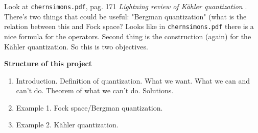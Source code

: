 Look at \texttt{chernsimons.pdf}, pag. 171 \textit{Lightning review of Kähler quantization} . There's two things that could be useful: "Bergman quantization" (what is the relation between this and Fock space? Looks like in \texttt{chernsimons.pdf} there is a nice formula for the operators. Second thing is the construction (again) for the Kähler quantization. So this is two objectives.

\textbf{Structure of this project} 
\begin{enumerate}
	\item Introduction. Definition of quantization. What we want. What we can and can't do. Theorem of what we can't do. Solutions.
	\item Example 1. Fock space/Bergman quantization.
	\item Example 2. Kähler quantization.
\end{enumerate}


